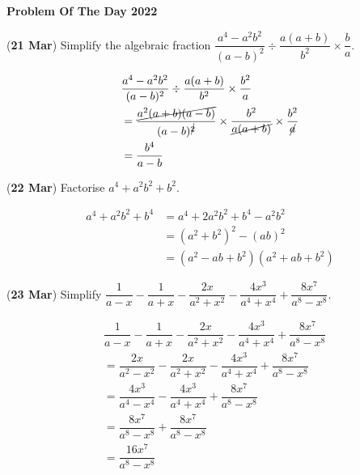 \documentclass[12pt, answers]{exam}
\begin{document}
\onehalfspacing%
\begin{center}
	\Large
	\textbf{Problem Of The Day 2022}
\end{center}

\begin{questions}
	\question (\textbf{21 Mar}) Simplify the algebraic fraction
	\( \dfrac{a^4-a^2b^2}{(a-b)^2} \div \dfrac{a(a+b)}{b^2} \times \dfrac{b}{a} \).

	\begin{solution}
		\begin{align*}
			 & \dfrac{a^4-a^2b^2}{(a-b)^2} \div \dfrac{a(a+b)}{b^2} \times \dfrac{b^2}{a}                                              \\
			 & = \dfrac{\cancel{a^2(a+b)(a-b)}}{(a-b)^{\cancel{2}}} \times \dfrac{b^2}{\cancel{a(a+b)}} \times \dfrac{b^2}{\cancel{a}} \\
			 & = \dfrac{b^4}{a-b}
		\end{align*}
	\end{solution}

	\question (\textbf{22 Mar}) Factorise \(a^4+a^2b^2+b^2\).
	\begin{solution}
		\begin{align*}
			a^4 + a^2b^2 + b^4 & = a^4 + 2a^2b^2 + b^4 - a^2b^2     \\
			                   & = (a^2 + b^2)^2 - (ab)^2           \\
			                   & = (a^2 - ab + b^2)(a^2 + ab + b^2)
		\end{align*}
	\end{solution}

	\question (\textbf{23 Mar}) Simplify \(\dfrac{1}{a-x}-\dfrac{1}{a+x}-\dfrac{2x}{a^2+x^2}-\dfrac{4x^3}{a^4+x^4}+\dfrac{8x^7}{a^8-x^8}\).
	\begin{solution}
		\begin{align*}
			 & \dfrac{1}{a-x}-\dfrac{1}{a+x}-\dfrac{2x}{a^2+x^2}-\dfrac{4x^3}{a^4+x^4}+\dfrac{8x^7}{a^8-x^8} \\
			 & = \dfrac{2x}{a^2-x^2}-\dfrac{2x}{a^2+x^2}-\dfrac{4x^3}{a^4+x^4}+\dfrac{8x^7}{a^8-x^8}         \\
			 & = \dfrac{4x^3}{a^4-x^4}-\dfrac{4x^3}{a^4+x^4}+\dfrac{8x^7}{a^8-x^8}                           \\
			 & = \dfrac{8x^7}{a^8-x^8}+\dfrac{8x^7}{a^8-x^8}                                                 \\
			 & = \dfrac{16x^7}{a^8-x^8}
		\end{align*}
	\end{solution}


\end{questions}
\end{document}
